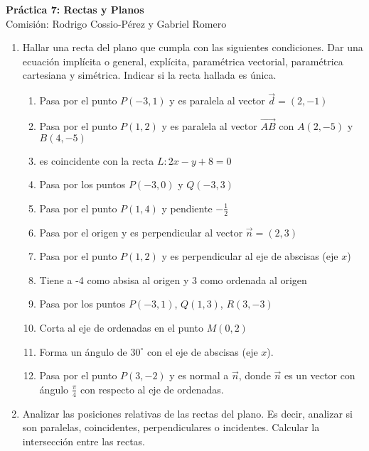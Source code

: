 \documentclass[a4paper]{article}
\newcommand{\exercise}{\item}
\begin{document}
\noindent \hrulefill 
\vspace{-7pt}
\begin{center} 
	\textbf{ Práctica 7: Rectas y Planos } \\
	Comisión: Rodrigo Cossio-Pérez y Gabriel Romero
\end{center}
\vspace{-10pt}
\hrulefill
\begin{enumerate}
	\exercise Hallar una recta del plano que cumpla con las siguientes condiciones. Dar una ecuación implícita o general, explícita, paramétrica vectorial, paramétrica cartesiana y simétrica. Indicar si la recta hallada es única.
	\begin{enumerate} [label=(\alph*)]
		\item Pasa por el punto $P(-3,1)$ y es paralela al vector $\vec{d}=(2,-1)$
		\item Pasa por el punto $P(1,2)$ y es paralela al vector $\overrightarrow{AB}$ con $A(2,-5)$ y $B(4,-5)$
		\item es coincidente con la recta $L: 2x-y+8=0$
		\item Pasa por los puntos $P(-3,0)$ y $Q(-3,3)$
		\item Pasa por el punto $P(1,4)$ y pendiente $\displaystyle{-\frac{1}{2}}$
		\item Pasa por el origen y es perpendicular al vector $\vec{n}=(2,3)$
		\item Pasa por el punto $P(1,2)$ y es perpendicular al eje de abscisas (eje $x$)
		\item Tiene a -4 como absisa al origen y 3 como ordenada al origen
		\item Pasa por los puntos $P(-3,1)$, $Q(1,3)$, $R(3,-3)$
		\item Corta al eje de ordenadas en el punto $M(0,2)$
		\item Forma un ángulo de $30^{\circ}$ con el eje de abscisas (eje $x$).
		\item Pasa por el punto $P(3,-2)$ y es normal a $\vec{n}$, donde $\vec{n}$ es un vector con ángulo $\displaystyle\frac{\pi}{4}$ con respecto al eje de ordenadas.
	\end{enumerate}
	\exercise Analizar las posiciones relativas de las rectas del plano. Es decir, analizar si son paralelas, coincidentes, perpendiculares o incidentes. Calcular la intersección entre las rectas.
	\begin{enumerate} [label=(\alph*)]

\end{enumerate}
\end{enumerate}
\end{document}
